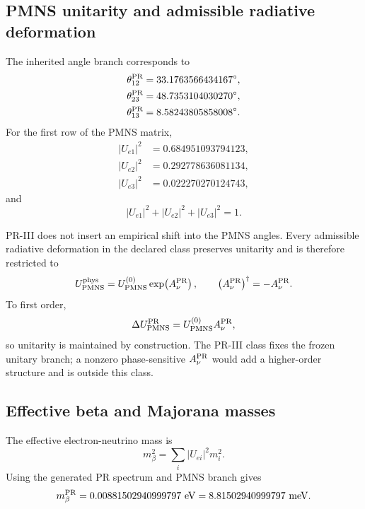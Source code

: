 \documentclass[11pt]{article}
\begin{document}
\subsection{PMNS unitarity and admissible radiative deformation}
\label{subsec:priii-neutrino-pmns-stability}

The inherited angle branch corresponds to
\begin{align}
\theta_{12}^{\rm PR}&=33.1763566434167^\circ,\\
\theta_{23}^{\rm PR}&=48.7353104030270^\circ,\\
\theta_{13}^{\rm PR}&=8.58243805858008^\circ .
\end{align}
For the first row of the PMNS matrix,
\begin{align}
|U_{e1}|^2&=0.684951093794123,\\
|U_{e2}|^2&=0.292778636081134,\\
|U_{e3}|^2&=0.022270270124743,
\end{align}
and
\begin{equation}
|U_{e1}|^2+|U_{e2}|^2+|U_{e3}|^2=1.
\end{equation}

PR-III does not insert an empirical shift into the PMNS angles.  Every
admissible radiative deformation in the declared class preserves unitarity and is therefore restricted to
\begin{equation}
U_{\rm PMNS}^{\rm phys}
=
U_{\rm PMNS}^{(0)}
\exp\!\left(A_\nu^{\rm PR}\right),
\qquad
\left(A_\nu^{\rm PR}\right)^\dagger
=
-A_\nu^{\rm PR}.
\label{eq:priii-pmns-unitary-update}
\end{equation}
To first order,
\begin{equation}
\Delta U_{\rm PMNS}^{\rm PR}
=
U_{\rm PMNS}^{(0)}A_\nu^{\rm PR},
\end{equation}
so unitarity is maintained by construction.  The PR-III class fixes the frozen
unitary branch; a nonzero phase-sensitive \(A_\nu^{\rm PR}\) would add a
higher-order structure and is outside this class.

\subsection{Effective beta and Majorana masses}
\label{subsec:priii-neutrino-effective-masses}

The effective electron-neutrino mass is
\begin{equation}
m_\beta^2
=
\sum_i |U_{ei}|^2m_i^2.
\end{equation}
Using the generated PR spectrum and PMNS branch gives
\begin{equation}
m_\beta^{\rm PR}
=
0.00881502940999797\ {\rm eV}
=
8.81502940999797\ {\rm meV}.
\label{eq:priii-mbeta}
\end{equation}
\end{document}

